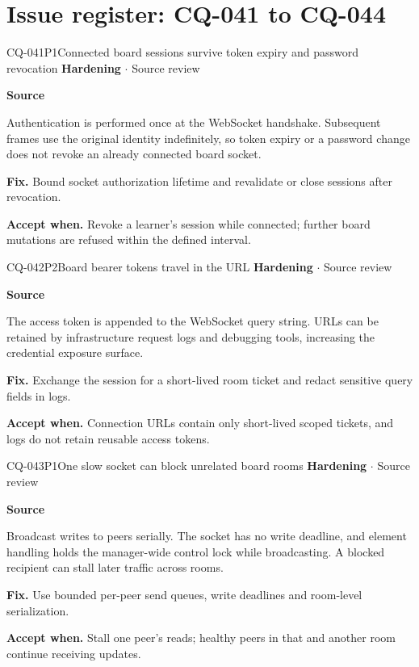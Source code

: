 \section*{Issue register: CQ-041 to CQ-044}
\begin{finding}{CQ-041}{P1}{Connected board sessions survive token expiry and password revocation}
\textbf{Hardening} $\cdot$ Source review\par
\textbf{Source}\quad{}\par
Authentication is performed once at the WebSocket handshake. Subsequent frames use the original identity indefinitely, so token expiry or a password change does not revoke an already connected board socket.\par
\textbf{Fix.} Bound socket authorization lifetime and revalidate or close sessions after revocation.\par
\textbf{Accept when.} Revoke a learner's session while connected; further board mutations are refused within the defined interval.
\end{finding}
\begin{finding}{CQ-042}{P2}{Board bearer tokens travel in the URL}
\textbf{Hardening} $\cdot$ Source review\par
\textbf{Source}\quad{}\par
The access token is appended to the WebSocket query string. URLs can be retained by infrastructure request logs and debugging tools, increasing the credential exposure surface.\par
\textbf{Fix.} Exchange the session for a short-lived room ticket and redact sensitive query fields in logs.\par
\textbf{Accept when.} Connection URLs contain only short-lived scoped tickets, and logs do not retain reusable access tokens.
\end{finding}
\begin{finding}{CQ-043}{P1}{One slow socket can block unrelated board rooms}
\textbf{Hardening} $\cdot$ Source review\par
\textbf{Source}\quad{}\par
Broadcast writes to peers serially. The socket has no write deadline, and element handling holds the manager-wide control lock while broadcasting. A blocked recipient can stall later traffic across rooms.\par
\textbf{Fix.} Use bounded per-peer send queues, write deadlines and room-level serialization.\par
\textbf{Accept when.} Stall one peer's reads; healthy peers in that and another room continue receiving updates.
\end{finding}

